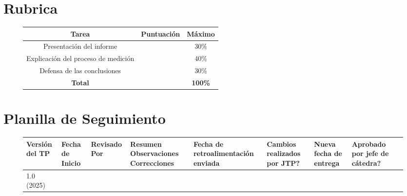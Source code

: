 \section{Rubrica}
\begin{figure}[!h]
  \centering
  \begin{tabular}[c]{|c|c|c|}
    \rowcolor{gray!30}
    \hline
    \textbf{Tarea}                      & \textbf{Puntuación} & \textbf{Máximo}\\
    \hline
    Presentación del informe            &                     & 30\%\\
    \hline
    Explicación del proceso de medición &                     & 40\%\\
    \hline
    Defensa de las conclusiones         &                     & 30\%\\
    \hline
    \textbf{Total}                      &                     & \textbf{100\%}\\
    \hline
  \end{tabular}
\end{figure}

\section{Planilla de Seguimiento}
\begin{figure}[!h]
  \begin{footnotesize}
    \begin{tabular}{|m{1cm}|m{1cm}|m{1.3cm}|m{2cm}|m{1.7cm}|m{1.7cm}|m{1.7cm}|m{1.7cm}|m{1.7cm}|}
      \hline
      Versión del TP & Fecha de Inicio & Revisado Por & Resumen Observaciones Correcciones &
      Fecha de retroalimentación enviada & Cambios realizados por JTP? & Nueva fecha de entrega &
      Aprobado por jefe de cátedra?\\
      \hline
      1.0 (2025) & & & & & & &\\
      \hline
    \end{tabular}
  \end{footnotesize}
\end{figure}
